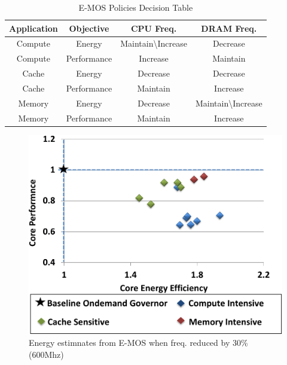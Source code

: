 \begin{table}[h]
\footnotesize
\def\arraystretch{0.52}
\setlength{\tabcolsep}{.15em}
\center
\begin{tabular}{cccc} \toprule
Application & Objective & CPU Freq. & DRAM Freq.  \\ \midrule
Compute & Energy & Maintain\textbackslash{Increase} & Decrease \\
Compute & Performance & Increase & Maintain \\
Cache  & Energy &  Decrease & Decrease \\ 
Cache  & Performance &  Maintain & Increase \\ 
Memory & Energy & Decrease & Maintain\textbackslash{Increase} \\
Memory & Performance & Maintain & Increase \\ \midrule
\end{tabular}
\caption{E-MOS Policies Decision Table}\label{tbl:emos-dec}
\end{table}

\begin{figure}[h]
  \begin{center}
\includegraphics[width=\linewidth]{figs/ana-reduce-crop.pdf}
  \end{center}
  \vspace{-0.1in}
  \caption{Energy estimnates from E-MOS when freq. reduced by 30\% (600Mhz)}
	\label{fig:reduce-freq}
\end{figure}


